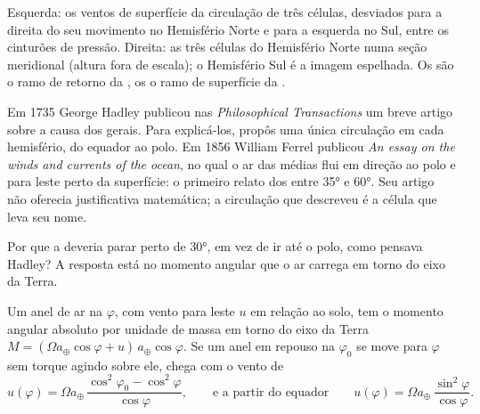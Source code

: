 \begin{omfigure}
{\small Esquerda: os ventos de superfície da circulação de três células, desviados para a direita do
seu movimento no Hemisfério Norte e para a esquerda no Sul, entre os cinturões de pressão. Direita: as
três células do Hemisfério Norte numa seção meridional (altura fora de escala); o Hemisfério Sul é a
imagem espelhada. Os  são o ramo de retorno da , os  o ramo de
superfície da .}
\label{fig:b1:atmospheric-circulation:three-cells}
\end{omfigure}

\begin{history}
Em 1735 George Hadley publicou nas \emph{Philosophical Transactions} um breve artigo sobre a causa
dos  gerais. Para explicá-los, propôs uma única circulação em cada hemisfério, do equador ao
polo. Em 1856 William Ferrel publicou \emph{An essay on the winds and currents of the ocean}, no qual
o ar das  médias flui em direção ao polo e para leste perto da superfície: o primeiro relato
dos  entre \ang{35} e \ang{60}. Seu artigo não oferecia justificativa matemática; a
circulação que descreveu é a célula que leva seu nome.
\end{history}

Por que a  deveria parar perto de \ang{30}, em vez de ir até o polo, como pensava
Hadley? A resposta está no momento angular que o ar carrega em torno do eixo da Terra.

\begin{proposition}\label{prop:b1:atmospheric-circulation:angular-momentum}
Um anel de ar na  $\varphi$, com vento para leste $u$ em relação ao solo, tem o momento
angular absoluto por unidade de massa em torno do eixo da Terra $M =
(\Omega a_\oplus\cos\varphi + u)\,a_\oplus\cos\varphi$. Se um anel em repouso na  $\varphi_0$
se move para $\varphi$ sem torque agindo sobre ele, chega com o vento de
\[
  u(\varphi) = \Omega a_\oplus\,\frac{\cos^2\varphi_0 - \cos^2\varphi}{\cos\varphi},
  \qquad\text{e a partir do equador}\qquad
  u(\varphi) = \Omega a_\oplus\,\frac{\sin^2\varphi}{\cos\varphi} .
\]
\end{proposition}

